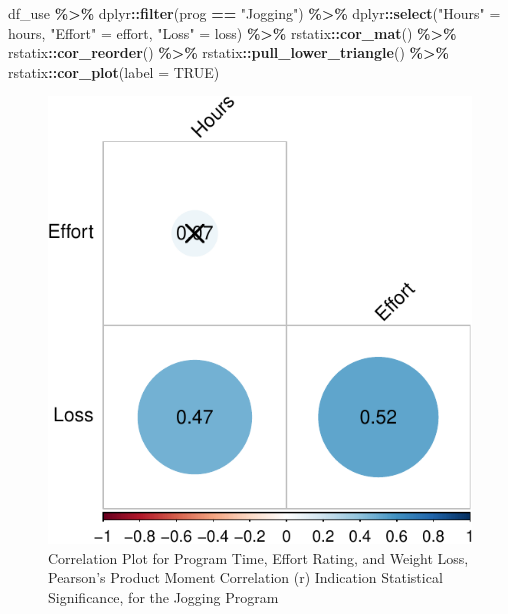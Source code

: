 \documentclass[
]{article}
\newenvironment{Shaded}{\begin{snugshade}}{\end{snugshade}}
\newcommand{\AttributeTok}[1]{\textcolor[rgb]{0.13,0.29,0.53}{#1}}
\newcommand{\ConstantTok}[1]{\textcolor[rgb]{0.56,0.35,0.01}{#1}}
\newcommand{\FunctionTok}[1]{\textcolor[rgb]{0.13,0.29,0.53}{\textbf{#1}}}
\newcommand{\NormalTok}[1]{#1}
\newcommand{\OtherTok}[1]{\textcolor[rgb]{0.56,0.35,0.01}{#1}}
\newcommand{\SpecialCharTok}[1]{\textcolor[rgb]{0.81,0.36,0.00}{\textbf{#1}}}
\newcommand{\StringTok}[1]{\textcolor[rgb]{0.31,0.60,0.02}{#1}}
\begin{document}
\clearpage

\begin{Shaded}
\begin{Highlighting}[]
\NormalTok{df\_use }\SpecialCharTok{\%\textgreater{}\%} 
\NormalTok{  dplyr}\SpecialCharTok{::}\FunctionTok{filter}\NormalTok{(prog }\SpecialCharTok{==} \StringTok{"Jogging"}\NormalTok{) }\SpecialCharTok{\%\textgreater{}\%} 
\NormalTok{  dplyr}\SpecialCharTok{::}\FunctionTok{select}\NormalTok{(}\StringTok{"Hours"} \OtherTok{=}\NormalTok{ hours, }
                \StringTok{"Effort"} \OtherTok{=}\NormalTok{ effort, }
                \StringTok{"Loss"} \OtherTok{=}\NormalTok{ loss) }\SpecialCharTok{\%\textgreater{}\%} 
\NormalTok{  rstatix}\SpecialCharTok{::}\FunctionTok{cor\_mat}\NormalTok{() }\SpecialCharTok{\%\textgreater{}\%}   
\NormalTok{  rstatix}\SpecialCharTok{::}\FunctionTok{cor\_reorder}\NormalTok{() }\SpecialCharTok{\%\textgreater{}\%}
\NormalTok{  rstatix}\SpecialCharTok{::}\FunctionTok{pull\_lower\_triangle}\NormalTok{() }\SpecialCharTok{\%\textgreater{}\%}
\NormalTok{  rstatix}\SpecialCharTok{::}\FunctionTok{cor\_plot}\NormalTok{(}\AttributeTok{label =} \ConstantTok{TRUE}\NormalTok{)}
\end{Highlighting}
\end{Shaded}

\begin{figure}[hb]

\includegraphics{Appendix_ex_weightloss_files/figure-latex/unnamed-chunk-24-1} \hfill{}

\caption{Correlation Plot for Program Time, Effort Rating, and Weight Loss, Pearson's Product Moment Correlation (r) Indication Statistical Significance, for the Jogging Program}\label{fig:unnamed-chunk-24}
\end{figure}
\end{document}
